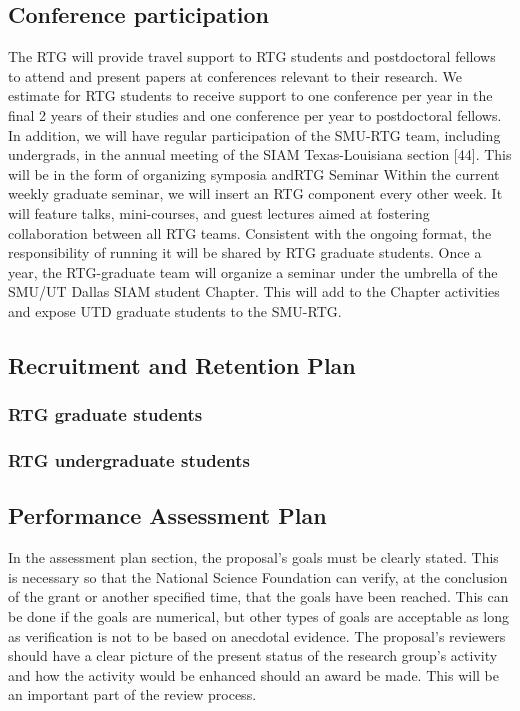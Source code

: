 \documentclass[11pt]{article}
\begin{document}
\subsection{Conference participation}
The RTG will provide travel support to RTG students and postdoctoral fellows to attend and present
papers at conferences relevant to their research. We estimate for RTG students to receive support to one
conference per year in the final 2 years of their studies and one conference per year to postdoctoral fellows.
In addition, we will have regular participation of the SMU-RTG team, including undergrads, in the annual
meeting of the SIAM Texas-Louisiana section [44]. This will be in the form of organizing symposia andRTG Seminar
Within the current weekly graduate seminar, we will insert an RTG component every other week. It
will feature talks, mini-courses, and guest lectures aimed at fostering collaboration between all RTG teams.
Consistent with the ongoing format, the responsibility of running it will be shared by RTG graduate students.
Once a year, the RTG-graduate team will organize a seminar under the umbrella of the SMU/UT Dallas
SIAM student Chapter. This will add to the Chapter activities and expose UTD graduate students to the
SMU-RTG. 
   



\subsection{Recruitment and Retention Plan}

  \subsubsection{RTG graduate students}

 
  \subsubsection{RTG undergraduate students} 
  







\subsection{Performance Assessment Plan  }


 In the assessment plan section, the proposal's goals must be clearly stated. This is necessary so that the National Science Foundation can verify, at the conclusion of the grant or another specified time, that the goals have been reached. This can be done if the goals are numerical, but other types of goals are acceptable as long as verification is not to be based on anecdotal evidence. The proposal's reviewers should have a clear picture of the present status of the research group's activity and how the activity would be enhanced should an award be made. This will be an important part of the review process.
\end{document}
